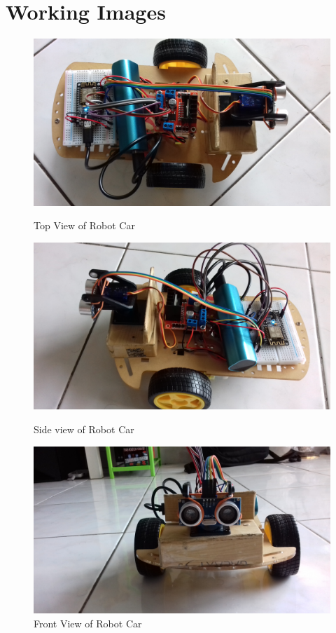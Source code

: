 \documentclass[sigconf]{acmart}
\begin{document}
\section{Working Images}

\begin{figure}[htb]
	\includegraphics[width=1.0\columnwidth]{images/Top-view.jpg}
	\caption{Top View of Robot Car}

	\includegraphics[width=1.0\columnwidth]{images/Side-view2.jpg}
	\caption{Side view of Robot Car}

	\includegraphics[width=1.0\columnwidth]{images/Front-view.jpg}
	\caption{Front View of Robot Car}
\end{figure}
\end{document}
